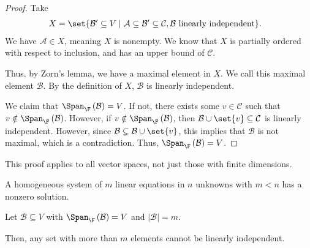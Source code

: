 \documentclass[10pt]{mypackage}
\begin{document}
\begin{proof}
  Take
  \begin{align*}
    X &= \set{\mathcal{B}'\subseteq V\mid \mathcal{A}\subseteq \mathcal{B}'\subseteq \mathcal{C},\mathcal{B}\text{ linearly independent}}.
  \end{align*}
  We have $\mathcal{A}\in X$, meaning $X$ is nonempty. We know that $X$ is partially ordered with respect to inclusion, and has an upper bound of $\mathcal{C}$.\newline

  Thus, by Zorn's lemma, we have a maximal element in $X$. We call this maximal element $\mathcal{B}$. By the definition of $X$, $\mathcal{B}$ is linearly independent.\newline

  We claim that $\Span_{\F}\left(\mathcal{B}\right) = V$. If not, there exists some $v\in \mathcal{C}$ such that $v\notin \Span_{\F}\left(\mathcal{B}\right)$. However, if $v\notin \Span_{\F}\left(\mathcal{B}\right)$, then $\mathcal{B}\cup \set{v}\subseteq \mathcal{C}$ is linearly independent. However, since $\mathcal{B}\subsetneq \mathcal{B}\cup \set{v}$, this implies that $\mathcal{B}$ is not maximal, which is a contradiction. Thus, $\Span_{\F}\left(\mathcal{B}\right) = V$.
\end{proof}
\begin{remark}
This proof applies to all vector spaces, not just those with finite dimensions.
\end{remark}
\begin{lemma}
  A homogeneous system of $m$ linear equations in $n$ unknowns with $m < n$ has a nonzero solution.
\end{lemma}
\begin{corollary}
  Let $\mathcal{B}\subseteq V$ with $\Span_{\F}\left(\mathcal{B}\right) = V$ and $\left\vert \mathcal{B} \right\vert = m$.\newline

  Then, any set with more than $m$ elements cannot be linearly independent.
\end{corollary}
\end{document}
